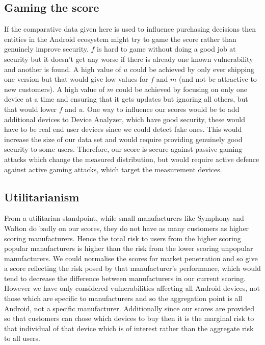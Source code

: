 \subsection{Gaming the score}
If the comparative data given here is used to influence purchasing decisions then entities in the Android ecosystem might try to game the score rather than genuinely improve security.
$f$ is hard to game without doing a good job at security but it doesn't get any worse if there is already one known vulnerability and another is found.
A high value of $u$ could be achieved by only ever shipping one version but that would give low values for $f$ and $m$ (and not be attractive to new customers).
A high value of $m$ could be achieved by focusing on only one device at a time and ensuring that it gets updates but ignoring all others, but that would lower $f$ and $u$.
One way to influence our scores would be to add additional devices to Device Analyzer, which have good security, these would have to be real end user devices since we could detect fake ones.
This would increase the size of our data set and would require providing genuinely good security to some users.
Therefore, our score is secure against passive gaming attacks which change the measured distribution, but would require active defence against active gaming attacks, which target the measurement devices.

\subsection{Utilitarianism}
From a utilitarian standpoint, while small manufacturers like Symphony and Walton do badly on our scores, they do not have as many customers as higher scoring manufacturers.
Hence the total risk to users from the higher scoring popular manufacturers is higher than the risk from the lower scoring unpopular manufacturers.
We could normalise the scores for market penetration and so give a score reflecting the risk posed by that manufacturer's performance, which would tend to decrease the difference between manufacturers in our current scoring.
However we have only considered vulnerabilities affecting all Android devices, not those which are specific to manufacturers and so the aggregation point is all Android, not a specific manufacturer.
Additionally since our scores are provided so that customers can chose which devices to buy then it is the marginal risk to that individual of that device which is of interest rather than the aggregate risk to all users.